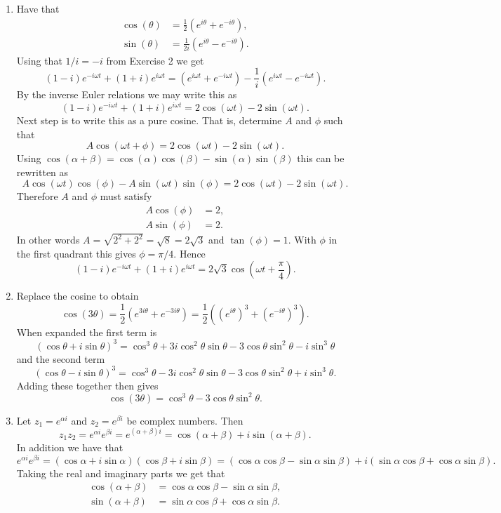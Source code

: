 \begin{enumerate}


\item Have that 
\begin{align*}
    \cos(\theta)&=\frac{1}{2}(e^{i\theta}+e^{-i\theta}), \\
    \sin(\theta)&=\frac{1}{2i}(e^{i\theta}-e^{-i\theta}).
\end{align*}
Using that $1/i=-i$ from Exercise 2 we get
$$(1-i)e^{-i\omega t}+(1+i)e^{i\omega t}=(e^{i\omega t}+e^{-i\omega t})-\frac{1}{i}(e^{i\omega t}-e^{-i\omega t}).$$
By the inverse Euler relations we may write this as
$$(1-i)e^{-i\omega t}+(1+i)e^{i\omega t}=2\cos(\omega t)-2\sin(\omega t).$$
Next step is to write this as a pure cosine. That is, determine $A$ and $\phi$ such that 
$$A\cos(\omega t+\phi)=2\cos(\omega t)-2\sin(\omega t).$$
Using $\cos(\alpha+\beta)=\cos(\alpha)\cos(\beta)-\sin(\alpha)\sin(\beta)$ this can be rewritten as
$$A\cos(\omega t)\cos(\phi)-A\sin(\omega t)\sin(\phi)=2\cos(\omega t)-2\sin(\omega t).$$
Therefore $A$ and $\phi$ must satisfy
\begin{align*}
    A\cos(\phi)&=2, \\
    A\sin(\phi)&=2.
\end{align*}
In other words $A=\sqrt{2^{2}+2^{2}}=\sqrt{8}=2\sqrt{3}$ and $\tan(\phi)=1$. With $\phi$ in the first quadrant this gives $\phi=\pi/4$. Hence
$$(1-i)e^{-i\omega t}+(1+i)e^{i\omega t}=2\sqrt{3}\cos\left(\omega t+\frac{\pi}{4}\right).$$

\item Replace the cosine to obtain
$$\cos(3\theta)=\frac{1}{2}(e^{3i\theta}+e^{-3i\theta})=\frac{1}{2}((e^{i\theta})^{3}+(e^{-i\theta})^{3}).$$
When expanded the first term is
$$(\cos\theta+i\sin\theta)^{3}=\cos^{3}\theta+3i\cos^{2}\theta\sin\theta-3\cos\theta\sin^{2}\theta-i\sin^{3}\theta$$
and the second term
$$(\cos\theta-i\sin\theta)^{3}=\cos^{3}\theta-3i\cos^{2}\theta\sin\theta-3\cos\theta\sin^{2}\theta+i\sin^{3}\theta.$$
Adding these together then gives
$$\cos(3\theta)=\cos^{3}\theta-3\cos\theta\sin^{2}\theta.$$

\item Let $z_{1}=e^{\alpha i}$ and $z_{2}=e^{\beta i}$ be complex numbers. Then
$$z_{1}z_{2}=e^{\alpha i}e^{\beta i}=e^{(\alpha+\beta)i}=\cos(\alpha+\beta)+i\sin(\alpha+\beta).$$
In addition we have that
$$e^{\alpha i}e^{\beta i}=(\cos\alpha+i\sin\alpha)(\cos\beta+i\sin\beta)=(\cos\alpha\cos\beta-\sin\alpha\sin\beta)+i(\sin\alpha\cos\beta+\cos\alpha\sin\beta).$$
Taking the real and imaginary parts we get that
\begin{align*}
    \cos(\alpha+\beta)&=\cos\alpha\cos\beta-\sin\alpha\sin\beta, \\
    \sin(\alpha+\beta)&=\sin\alpha\cos\beta+\cos\alpha\sin\beta.
\end{align*}


\end{enumerate}
